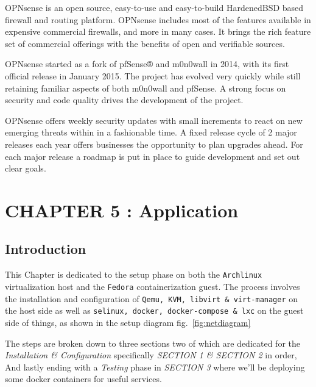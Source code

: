\documentclass[
  14pt,
  english,
  a4paper,
]{scrreprt}
\begin{document}
OPNsense is an open source, easy-to-use and easy-to-build HardenedBSD
based firewall and routing platform. OPNsense includes most of the
features available in expensive commercial firewalls, and more in many
cases. It brings the rich feature set of commercial offerings with the
benefits of open and verifiable sources.

OPNsense started as a fork of pfSense® and m0n0wall in 2014, with its
first official release in January 2015. The project has evolved very
quickly while still retaining familiar aspects of both m0n0wall and
pfSense. A strong focus on security and code quality drives the
development of the project.

OPNsense offers weekly security updates with small increments to react
on new emerging threats within in a fashionable time. A fixed release
cycle of 2 major releases each year offers businesses the opportunity to
plan upgrades ahead. For each major release a roadmap is put in place to
guide development and set out clear goals.

\hypertarget{chapter-5-application}{%
\chapter{CHAPTER 5 : Application}\label{chapter-5-application}}

\hypertarget{introduction-7}{%
\section{Introduction}\label{introduction-7}}

This Chapter is dedicated to the setup phase on both the
\texttt{Archlinux} virtualization host and the \texttt{Fedora}
containerization guest. The process involves the installation and
configuration of \texttt{Qemu,\ KVM,\ libvirt\ \&\ virt-manager} on the
host side as well as \texttt{selinux,\ docker,\ docker-compose\ \&\ lxc}
on the guest side of things, as shown in the setup diagram
fig.~\ref{fig:netdiagram}

The steps are broken down to three sections two of which are dedicated
for the \emph{Installation \& Configuration} specifically \emph{SECTION
1 \& SECTION 2} in order, And lastly ending with a \emph{Testing} phase
in \emph{SECTION 3} where we'll be deploying some docker containers for
useful services.
\end{document}
